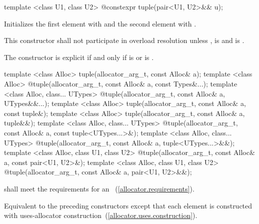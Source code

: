 %
%
\begin{itemdecl}
template <class U1, class U2> @\EXPLICIT@ constexpr tuple(pair<U1, U2>&& u);
\end{itemdecl}

\begin{itemdescr}
\pnum
\effects Initializes the first element with
 and the
second element with .

\pnum
\remarks This constructor shall not participate in overload resolution unless
,
 is  and
 is .

\pnum
The constructor is explicit if and only if
 is  or
 is .
\end{itemdescr}

%
\begin{itemdecl}
template <class Alloc>
  tuple(allocator_arg_t, const Alloc& a);
template <class Alloc>
  @\EXPLICIT@ tuple(allocator_arg_t, const Alloc& a, const Types&...);
template <class Alloc, class... UTypes>
  @\EXPLICIT@ tuple(allocator_arg_t, const Alloc& a, UTypes&&...);
template <class Alloc>
  tuple(allocator_arg_t, const Alloc& a, const tuple&);
template <class Alloc>
  tuple(allocator_arg_t, const Alloc& a, tuple&&);
template <class Alloc, class... UTypes>
  @\EXPLICIT@ tuple(allocator_arg_t, const Alloc& a, const tuple<UTypes...>&);
template <class Alloc, class... UTypes>
  @\EXPLICIT@ tuple(allocator_arg_t, const Alloc& a, tuple<UTypes...>&&);
template <class Alloc, class U1, class U2>
  @\EXPLICIT@ tuple(allocator_arg_t, const Alloc& a, const pair<U1, U2>&);
template <class Alloc, class U1, class U2>
  @\EXPLICIT@ tuple(allocator_arg_t, const Alloc& a, pair<U1, U2>&&);
\end{itemdecl}

\begin{itemdescr}
\pnum
\requires {} shall meet the requirements for an
~(\ref{allocator.requirements}).

\pnum
\effects Equivalent to the preceding constructors except that each element is constructed with
uses-allocator construction~(\ref{allocator.uses.construction}).
\end{itemdescr}

